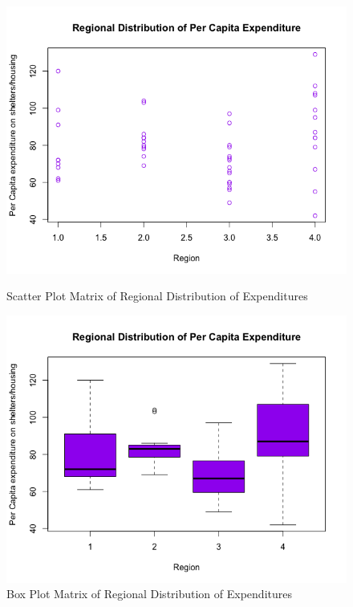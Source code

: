 \documentclass[12pt,letterpaper]{article}
\begin{document}
\begin{enumerate}
 \begin{figure}[h]
     \centering
       \begin{minipage}{.5\textwidth}
         \centering
           \includegraphics[width=\textwidth]{images/part2_one.png}
          \caption{Scatter Plot Matrix of Regional Distribution of Expenditures}
     \end{minipage}%
    \begin{minipage}{.45\textwidth}
       \centering
        \includegraphics[width=\textwidth]{images/part2_boxplot.png}
         \caption{Box Plot Matrix of Regional Distribution of Expenditures}
       \end{minipage}
      \end{figure}



\end{enumerate}
\end{document}

